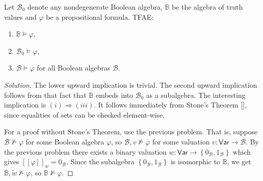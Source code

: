 \begin{problem}
    Let \( \mathcal{B}_0 \) denote any nondegenerate Boolean algebra, \( \mathbb{B} \) be the algebra of truth values and \( \varphi \) be a propositional formula. TFAE:
    \begin{enumerate}[label=(\roman*)]
        \item \( \mathbb{B} \models \varphi \),
        \item \( \mathcal{B}_0 \models \varphi \),
        \item \( \mathcal{B} \models \varphi \) for all Boolean algebras \( \mathcal{B} \).
    \end{enumerate}
\end{problem}

\begin{proof}[Solution]
    The lower upward implication is trivial. The second upward implication follows from that fact that \( \mathbb{B} \) embeds into \( \mathcal{B}_0 \) as a subalgebra. The interesting implication is \( (i) \Rightarrow (iii) \). It follows immediately from Stone's Theorem \ref{}, since equalities of sets can be checked element-wise. 

    For a proof without Stone's Theorem, use the previous problem. That is, suppose \( \mathcal{B} \not\models \varphi \) for some Boolean algebra \( \varphi \), so \( \mathcal{B}, v \not\models \varphi \) for some valuation \( v: \mathsf{Var} \to \mathcal{B} \). By the previous problem there exists a binary valuation \( w: \mathsf{Var} \to \left\{ 0_{ \mathcal{B} }, 1_{ \mathcal{B} } \right\} \) which gives \( \left[ \left[ \varphi \right] \right]_w = 0_{ \mathcal{B} } \). Since the subalgebra \( \left\{ 0_{ \mathcal{B} }, 1_{ \mathcal{B} } \right\}  \) is isomorphic to \( \mathbb{B} \), we get \( \mathbb{B}, \widetilde{w} \not\models \varphi \), so \( \mathbb{B} \not\models \varphi \).
\end{proof}

